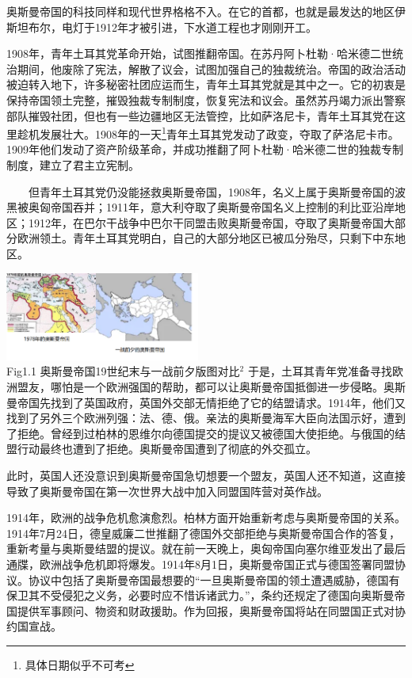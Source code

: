 \documentclass{article}
\begin{document}
奥斯曼帝国的科技同样和现代世界格格不入。在它的首都，也就是最发达的地区伊斯坦布尔，电灯于1912年才被引进，下水道工程也才刚刚开工。

1908年，青年土耳其党革命开始，试图推翻帝国。在苏丹阿卜杜勒·哈米德二世统治期间，他废除了宪法，解散了议会，试图加强自己的独裁统治。帝国的政治活动被迫转入地下，许多秘密社团应运而生，青年土耳其党就是其中之一。它的初衷是保持帝国领土完整，摧毁独裁专制制度，恢复宪法和议会。虽然苏丹竭力派出警察部队摧毁社团，但也有一些边疆地区无法管控，比如萨洛尼卡，青年土耳其党在这里趁机发展壮大。1908年的一天\footnote{具体日期似乎不可考}青年土耳其党发动了政变，夺取了萨洛尼卡市。1909年他们发动了资产阶级革命，并成功推翻了阿卜杜勒·哈米德二世的独裁专制制度，建立了君主立宪制。

\begin{flushleft}
    \justifying
    \ \ \ \ 但青年土耳其党仍没能拯救奥斯曼帝国，1908年，名义上属于奥斯曼帝国的波黑被奥匈帝国吞并；1911年，意大利夺取了奥斯曼帝国名义上控制的利比亚沿岸地区；1912年，在巴尔干战争中巴尔干同盟击败奥斯曼帝国，夺取了奥斯曼帝国大部分欧洲领土。青年土耳其党明白，自己的大部分地区已被瓜分殆尽，只剩下中东地区。
\end{flushleft}
\centering\includegraphics[width=6.4cm]{em.png}\\
\centering {} Fig1.1 奥斯曼帝国19世纪末与一战前夕版图对比$^2$\clearpage
{}
\justifying
\vspace{5pt}
于是，土耳其青年党准备寻找欧洲盟友，哪怕是一个欧洲强国的帮助，都可以让奥斯曼帝国抵御进一步侵略。奥斯曼帝国先找到了英国政府，英国外交部无情拒绝了它的结盟请求。1914年，他们又找到了另外三个欧洲列强：法、德、俄。亲法的奥斯曼海军大臣向法国示好，遭到了拒绝。曾经到过柏林的恩维尔向德国提交的提议又被德国大使拒绝。与俄国的结盟行动最终也遭到了拒绝。奥斯曼帝国遭到了彻底的外交孤立。

此时，英国人还没意识到奥斯曼帝国急切想要一个盟友，英国人还不知道，这直接导致了奥斯曼帝国在第一次世界大战中加入同盟国阵营对英作战。

1914年，欧洲的战争危机愈演愈烈。柏林方面开始重新考虑与奥斯曼帝国的关系。1914年7月24日，德皇威廉二世推翻了德国外交部拒绝与奥斯曼帝国合作的答复，重新考量与奥斯曼结盟的提议。就在前一天晚上，奥匈帝国向塞尔维亚发出了最后通牒，欧洲战争危机即将爆发。1914年8月1日，奥斯曼帝国正式与德国签署同盟协议。协议中包括了奥斯曼帝国最想要的“一旦奥斯曼帝国的领土遭遇威胁，德国有保卫其不受侵犯之义务，必要时应不惜诉诸武力。”，条约还规定了德国向奥斯曼帝国提供军事顾问、物资和财政援助。作为回报，奥斯曼帝国将站在同盟国正式对协约国宣战。
\end{document}
